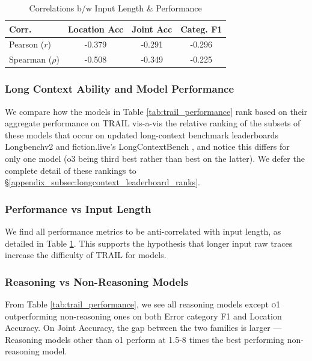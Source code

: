 \documentclass[11pt]{article}
\begin{document}
\begin{table}[ht]
    \centering
    \small
    \label{tab:correlations}
    \begin{tabular}{l|ccc}
    \hline
    \textbf{Corr.} & \textbf{Location Acc} & \textbf{Joint Acc} & \textbf{Categ. F1} \\
    \hline
    Pearson ($r$) & -0.379 & -0.291 & -0.296 \\
\hline
Spearman ($\rho$) & -0.508 & -0.349 & -0.225 \\
\hline
\end{tabular}
\caption{Correlations b/w Input Length \& Performance}
\label{tab:correl_perf_length_gaia_o3}
\end{table}

\subsubsection{Long Context Ability and Model Performance}
\label{subsubsec:longcontextability_correl}
We compare how the models in Table \ref{tab:trail_performance} rank based on their aggregate performance on \textsc{TRAIL} vis-a-vis the relative ranking of the subsets of these models that occur on updated long-context benchmark leaderboards Longbenchv2 and fiction.live's LongContextBench \cite{bai2024longbench,fictionlivebench2025}, and notice this differs for only one model (o3 being third best rather than best on the latter). We defer the complete detail of these rankings to \S\ref{appendix_subsec:longcontext_leaderboard_ranks}. 

\subsubsection{Performance vs Input Length}
\label{subsubsec:length_correl}
We find all performance metrics to be anti-correlated with input length, as detailed in Table \ref{tab:correl_perf_length_gaia_o3}. This supports the hypothesis that longer input raw traces increase the difficulty of \textsc{TRAIL} for models.

\subsubsection{Reasoning vs Non-Reasoning Models}
\label{subsubsec:reason_vs_nonreason}
From Table \ref{tab:trail_performance}, we see all reasoning models except \textsc{o1} outperforming non-reasoning ones on both Error category F1 and Location Accuracy. On Joint Accuracy, the gap between the two families is larger --- Reasoning models other than o1 perform at 1.5-8 times the best performing non-reasoning model.
\end{document}
